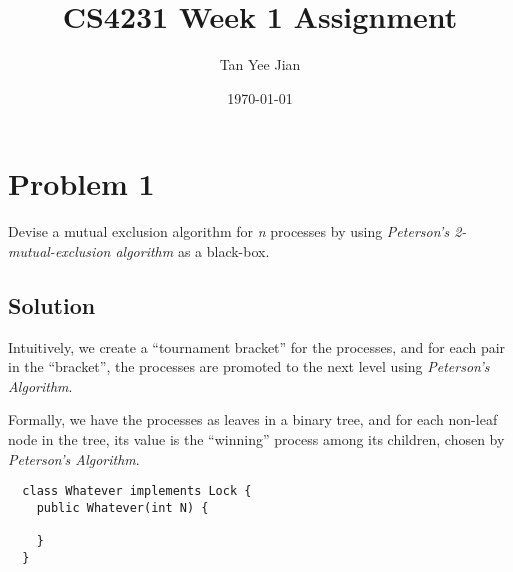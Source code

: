 \documentclass{article}
\title{CS4231 Week 1 Assignment}
\author{Tan Yee Jian}
\date{\today}
\newcommand{\problem}[1]{\section*{Problem #1}}
\newcommand{\solution}{\subsection*{Solution}}
\begin{document}
\maketitle
\problem{1}
Devise a mutual exclusion algorithm for \emph{n} processes by using
\emph{Peterson's 2-mutual-exclusion algorithm} as a black-box.
\solution
Intuitively, we create a ``tournament bracket'' for the processes, and for each
pair in the ``bracket'', the processes are promoted to the next level using
\emph{Peterson's Algorithm}.

Formally, we have the processes as leaves in a binary tree, and for each
non-leaf node in the tree, its value is the ``winning'' process among its
children, chosen by \emph{Peterson's Algorithm}.

\begin{verbatim}
  class Whatever implements Lock {
    public Whatever(int N) {

    }
  }
\end{verbatim}
\end{document}
